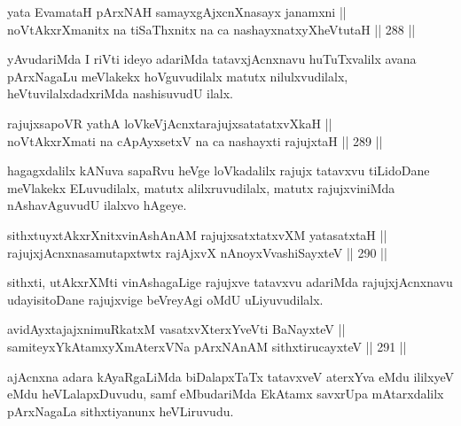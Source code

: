 \begin{shl}
yata EvamataH pArxNAH samayxgAjxcnXnasayx janamxni || \\
noVtAkxrXmanitx na tiSaThxnitx na ca nashayxnatxyXheVtutaH \hfill || 288 ||  
\end{shl}

\begin{artha}
yAvudariMda I riVti ideyo adariMda tatavxjAcnxnavu huTuTxvalilx avana
pArxNagaLu meVlakekx hoVguvudilalx matutx nilulxvudilalx,
heVtuvilalxdadxriMda nashisuvudU ilalx.
\end{artha}

\begin{shl}
rajujxsapoVR yathA loVkeV\s jAcnxtarajujxsatatatxvXkaH || \\
noVtAkxrXmati na cApAyxsetxV na ca nashayxti rajujxtaH \hfill || 289 ||  
\end{shl}

\begin{artha}
hagagxdalilx kANuva sapaRvu heVge loVkadalilx rajujx tatavxvu
tiLidoDane meVlakekx ELuvudilalx, matutx alilxruvudilalx, matutx
rajujxviniMda nAshavAguvudU ilalxvo hAgeye.
\end{artha}

\begin{shl}
sithxtuyxtAkxrXnitxvinAshAnAM rajujxsatxtatxvXM yatasatxtaH || \\
rajujxjAcnxnasamutapxtwtx rajAjxvX nAnoyxV\s vashiSayxteV \hfill || 290 ||  
\end{shl}

\begin{artha}
sithxti, utAkxrXMti vinAshagaLige rajujxve tatavxvu adariMda
rajujxjAcnxnavu udayisitoDane rajujxvige beVreyAgi oMdU uLiyuvudilalx.
\end{artha}


\begin{shl}
avidAyxtajajxnimuRkatxM vasatxvXterxYveVti BaNayxteV || \\
samiteyxYkAtamxyXmAterxVNa pArxNAnAM sithxtirucayxteV \hfill || 291 ||  
\end{shl}	

\begin{artha}
ajAcnxna adara kAyaRgaLiMda biDalapxTaTx tatavxveV aterxYva eMdu
ililxyeV eMdu heVLalapxDuvudu, samf eMbudariMda EkAtamx savxrUpa
mAtarxdalilx pArxNagaLa sithxtiyanunx heVLiruvudu.
\end{artha}

